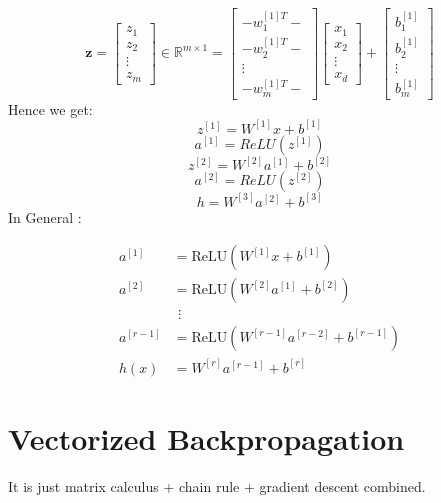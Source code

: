 \documentclass{article}
\begin{document}
\[
\mathbf{z} = \begin{bmatrix}
z_1 \\
z_2 \\
\vdots \\
z_m
\end{bmatrix} \in \mathbb{R}^{m \times 1} =
\begin{bmatrix}
-w^{[1]T}_1- \\
-w^{[1]T}_2- \\
\vdots \\
-w^{[1]T}_m-
\end{bmatrix}
\begin{bmatrix}
x_1 \\
x_2 \\
\vdots \\
x_d
\end{bmatrix}
+
\begin{bmatrix}
b^{[1]}_1 \\
b^{[1]}_2 \\
\vdots \\
b^{[1]}_m
\end{bmatrix}
\]
Hence we get: 
\[ z^{[1]}=W^{[1]}x+b^{[1]} \]
\[ a^{[1]} = ReLU(z^{[1]}) \]
\[ z^{[2]}=W^{[2]}a^{[1]}+b^{[2]} \]
\[ a^{[2]} = ReLU(z^{[2]}) \]
\[ h=W^{[3]}a^{[2]}+b^{[3]} \]
In General : 

\[
\begin{aligned}
a^{[1]} &= \text{ReLU}(W^{[1]}x + b^{[1]}) \\
a^{[2]} &= \text{ReLU}(W^{[2]}a^{[1]} + b^{[2]}) \\
&\ \, \vdots \\
a^{[r-1]} &= \text{ReLU}(W^{[r-1]}a^{[r-2]} + b^{[r-1]}) \\
h(x) &= W^{[r]}a^{[r-1]} + b^{[r]}
\end{aligned}
\]

\section{Vectorized Backpropagation}
It is just matrix calculus + chain rule + gradient descent combined.
\end{document}
